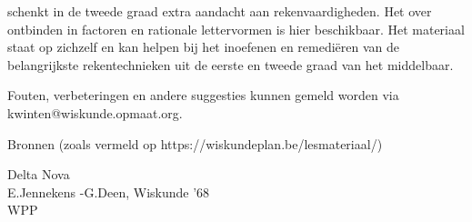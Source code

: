 \documentclass{ximera}
\begin{document}
	\author{Wiskundeplan}



 schenkt in de tweede graad extra aandacht aan rekenvaardigheden. 
Het  over ontbinden in factoren en rationale lettervormen is hier beschikbaar. 
Het materiaal staat op zichzelf en kan helpen bij het inoefenen en remediëren van de belangrijkste rekentechnieken uit de eerste en tweede graad van het middelbaar.  


Fouten, verbeteringen en andere suggesties kunnen gemeld worden via kwinten@wiskunde.opmaat.org. 

\vspace{1cm}


Bronnen (zoals vermeld op https://wiskundeplan.be/lesmateriaal/)

Delta Nova\\
E.Jennekens -G.Deen, Wiskunde '68\\
WPP\\
\end{document}
